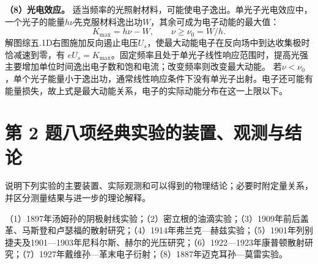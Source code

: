 \documentclass[UTF8,fontset=fandol,a4paper,11pt]{ctexart}
\begin{document}
\textbf{（8）光电效应。}
适当频率的光照射材料，可能使电子逸出。单光子光电效应中，一个光子的能量$h\nu$先克服材料逸出功$W$，其余可成为电子动能的最大值：
\[
\boxed{K_{\max}=h\nu-W},\qquad
\nu\ge\nu_0=W/h.
\]
解图综五.1D右图施加反向遏止电压$U_s$，使最大动能电子在反向场中到达收集极时恰减速到零，有
$eU_s=K_{\max}$。固定频率且处于单光子线性响应范围时，提高光强主要增加单位时间逸出电子数和饱和电流；改变频率则改变最大动能。
若$\nu<\nu_0$，单个光子能量小于逸出功，通常线性响应条件下没有单光子出射。电子还可能有能量损失，故上式是最大动能关系，电子的实际动能分布在这一上限以下。




\section*{第 2 题\quad 八项经典实验的装置、观测与结论}\label{q:2}


说明下列实验的主要装置、实际观测和可以得到的物理结论；必要时附定量关系，并区分测量结果与进一步的理论解释。

（1）1897年汤姆孙的阴极射线实验；（2）密立根的油滴实验；（3）1909年前后盖革、马斯登和卢瑟福的散射研究；（4）1914年弗兰克—赫兹实验；（5）1901年列别捷夫及1901—1903年尼科尔斯、赫尔的光压研究；（6）1922—1923年康普顿散射研究；（7）1927年戴维孙—革末电子衍射；（8）1887年迈克耳孙—莫雷实验。
\end{document}
